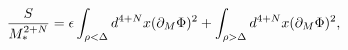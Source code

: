 \begin{equation}
{S\over M_*^{2+N}}= \epsilon \int_{ \rho < \Delta} d^{4+N} x 
(\partial_{M} \Phi)^2 + \int_{ \rho> \Delta} d^{4+N} x (\partial_{M} \Phi)^2,
\end{equation}

